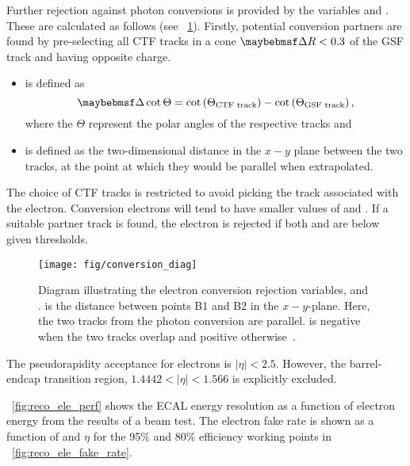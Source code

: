 Further rejection against photon conversions is provided by the variables
\Distnm and \DeltaCotThetanm. These are calculated as follows (see
\fig~\ref{fig:conversion_diag}). Firstly, potential conversion partners are
found by pre-selecting all \ac{CTF} tracks in a cone $\DeltaR < 0.3$ of the
\ac{GSF} track and having opposite charge.
\begin{itemize}
\item \DeltaCotThetanm is defined as
\begin{equation*}
  \DeltaCotThetanm = \cot\left(\Theta_{\textrm{CTF track}}\right) - \cot\left(\Theta_{\textrm{GSF track}}\right),
\end{equation*}
where the $\Theta$ represent the polar angles of the respective tracks and
\item \Distnm is defined as the two-dimensional distance in the $x-y$ plane
  between the two tracks, at the point at which they would be parallel when
  extrapolated.
\end{itemize}
The choice of \ac{CTF} tracks is restricted to avoid picking the track
associated with the electron. Conversion electrons will tend to have smaller
values of \DeltaCotTheta and \Dist. If a suitable partner track is found, the
electron is rejected if both \Dist and \DeltaCotTheta are below given
thresholds.

\begin{figure}[h!]
  \centering
  \texttt{[image: fig/conversion\_diag]}
  \caption[Diagram illustrating electron conversion rejection variables]{Diagram
    illustrating the electron conversion rejection variables, \Distnm and
    \DeltaCotThetanm. \Distnm is the distance between points B1 and B2 in the
    $x-y$-plane. Here, the two tracks from the photon conversion are
    parallel. \Distnm is negative when the two tracks overlap and positive
    otherwise~\cite{cms_an_2009_159}.}
  \label{fig:conversion_diag}
\end{figure}

The pseudorapidity acceptance for electrons is $|\eta| < 2.5$. However, the
barrel-endcap transition region, $1.4442 < |\eta| < 1.566$ is explicitly excluded.



\fig~\ref{fig:reco_ele_perf} shows the \ac{ECAL} energy resolution as
a function of electron energy from the results of a beam test. The
electron fake rate is shown as a function of \Et and $\eta$ for the
95\% and 80\% efficiency working points in
\fig~\ref{fig:reco_ele_fake_rate}.

